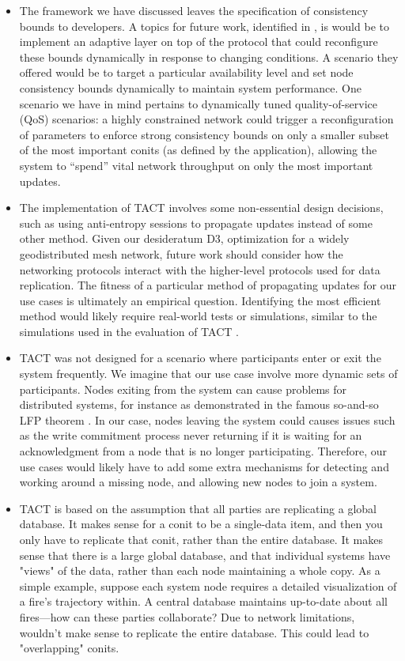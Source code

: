 \begin{itemize}
  \item The framework we have discussed leaves the specification of
    consistency bounds to developers. A topics for future work,
    identified in \cite{2002tact}, is would be to implement an
    adaptive layer on top of the protocol that could reconfigure these
    bounds dynamically in response to changing conditions. A scenario
    they offered would be to target a particular availability level
    and set node consistency bounds dynamically to maintain system
    performance. One scenario we have in mind pertains to dynamically
    tuned quality-of-service (QoS) scenarios: a highly constrained
    network could trigger a reconfiguration of parameters to enforce
    strong consistency bounds on only a smaller subset of the most
    important conits (as defined by the application), allowing the
    system to ``spend'' vital network throughput on only the most
    important updates.
  \item The implementation of TACT involves some non-essential design
    decisions, such as using anti-entropy sessions \cite{} to
    propagate updates instead of some other method. Given our
    desideratum D3, optimization for a widely geodistributed mesh
    network, future work should consider how the networking protocols
    interact with the higher-level protocols used for data
    replication. The fitness of a particular method of propagating
    updates for our use cases is ultimately an empirical
    question. Identifying the most efficient method would likely
    require real-world tests or simulations, similar to the
    simulations used in the evaluation of TACT \cite{}.
  \item TACT was not designed for a scenario where participants enter
    or exit the system frequently. We imagine that our use case
    involve more dynamic sets of participants. Nodes exiting from the
    system can cause problems for distributed systems, for instance as
    demonstrated in the famous so-and-so LFP theorem \cite{}. In our
    case, nodes leaving the system could causes issues such as the
    write commitment process never returning if it is waiting for an
    acknowledgment from a node that is no longer
    participating. Therefore, our use cases would likely have to add
    some extra mechanisms for detecting and working around a missing
    node, and allowing new nodes to join a system.
  \item TACT is based on the assumption that all parties are
    replicating a global database. It makes sense for a conit to be a
    single-data item, and then you only have to replicate that conit,
    rather than the entire database. It makes sense that there is a
    large global database, and that individual systems have "views" of
    the data, rather than each node maintaining a whole copy. As a
    simple example, suppose each system node requires a detailed
    visualization of a fire's trajectory within. A central database
    maintains up-to-date about all fires---how can these parties
    collaborate? Due to network limitations, wouldn't make sense to
    replicate the entire database. This could lead to "overlapping"
    conits.
\end{itemize}
